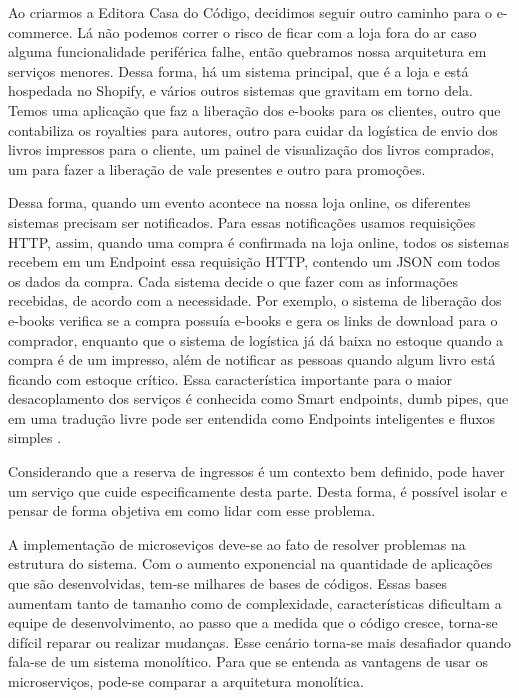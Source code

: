 \begin{citacao}

Ao criarmos a Editora Casa do Código, decidimos seguir outro caminho para o e-commerce.
Lá não podemos correr o risco de ficar com a loja fora do ar caso alguma funcionalidade
periférica falhe, então quebramos nossa arquitetura em serviços menores. Dessa forma, há
um sistema principal, que é a loja e está hospedada no Shopify, e vários outros sistemas
que gravitam em torno dela. Temos uma aplicação que faz a liberação dos e-books para os
clientes, outro que contabiliza os royalties para autores, outro para cuidar da logística
de envio dos livros impressos para o cliente, um painel de visualização dos livros comprados,
um para fazer a liberação de vale presentes e outro para promoções.

Dessa forma, quando um evento acontece na nossa loja online, os diferentes sistemas precisam
ser notificados. Para essas notificações usamos requisições HTTP, assim, quando uma compra
é confirmada na loja online, todos os sistemas recebem em um Endpoint essa requisição HTTP,
contendo um JSON com todos os dados da compra. Cada sistema decide o que fazer com as informações
recebidas, de acordo com a necessidade. Por exemplo, o sistema de liberação dos e-books verifica
se a compra possuía e-books e gera os links de download para o comprador, enquanto que o sistema
de logística já dá baixa no estoque quando a compra é de um impresso, além de notificar as pessoas
quando algum livro está ficando com estoque crítico. Essa característica importante para o maior
desacoplamento dos serviços é conhecida como Smart endpoints, dumb pipes, que em uma tradução
livre pode ser entendida como Endpoints inteligentes e fluxos
simples \cite{arquitetura-de-microservicos-ou-monolitica}.

\end{citacao}


Considerando que a reserva de ingressos é um contexto bem definido, pode haver um serviço que cuide
especificamente desta parte. Desta forma, é possível isolar e pensar de forma objetiva em como
lidar com esse problema.

A implementação de microseviços deve-se ao fato de resolver problemas na estrutura do sistema. Com o aumento exponencial
na quantidade de aplicações que são desenvolvidas, tem-se milhares de bases de códigos. Essas bases
aumentam tanto de tamanho como de complexidade, características dificultam a equipe de desenvolvimento, ao passo que a
medida que o código cresce, torna-se difícil reparar ou realizar mudanças. Esse cenário torna-se mais desafiador quando
fala-se de um sistema monolítico. Para que se entenda as vantagens de usar os microserviços, pode-se comparar a arquitetura
monolítica.


